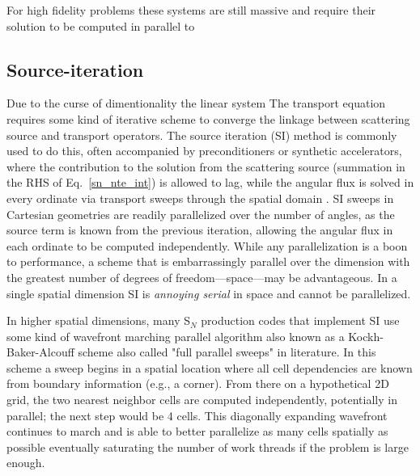 For high fidelity problems these systems are still massive and require their solution to be computed in parallel to 




\subsection{Source-iteration}
\label{sec:intro_itterative-scheme}

Due to the curse of dimentionality the linear system
The transport equation requires some kind of iterative scheme to converge the linkage between scattering source and transport operators.
The source iteration (SI) method is commonly used to do this, often accompanied by preconditioners or synthetic accelerators, where the contribution to the solution from the scattering source (summation in the RHS of Eq.~\eqref{sn_nte_int}) is allowed to lag, while the angular flux is solved in every ordinate via transport sweeps through the spatial domain \cite{adams_subcell_1997}.
SI sweeps in Cartesian geometries are readily parallelized over the number of angles, as the source term is known from the previous iteration, allowing the angular flux in each ordinate to be computed independently. 
While any parallelization is a boon to performance, a scheme that is embarrassingly parallel over the dimension with the greatest number of degrees of freedom---space---may be advantageous.
In a single spatial dimension SI is \textit{annoying serial} in space and cannot be parallelized.

In higher spatial dimensions, many S$_N$ production codes that implement SI use some kind of wavefront marching parallel algorithm also known as a Kockh-Baker-Alcouff scheme \cite{baker_kba_2017, colomer_parallel_2013} also called "full parallel sweeps" in literature.
In this scheme a sweep begins in a spatial location where all cell dependencies are known from boundary information (e.g., a corner).
From there on a hypothetical 2D grid, the two nearest neighbor cells are computed independently, potentially in parallel; the next step would be 4 cells.
This diagonally expanding wavefront continues to march and is able to better parallelize as many cells spatially as possible eventually saturating the number of work threads if the problem is large enough.

